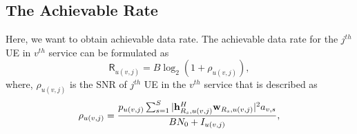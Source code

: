 \documentclass[conference]{IEEEtran}
\begin{document}
\subsection{The Achievable Rate}
Here, we want to obtain achievable data rate. The achievable data rate for the $j^{th}$ UE in $v^{th}$ service can be formulated as 
\begin{equation}\label{eq1}
\mathsf{R}_{u(v,j)} = B \log_2({1+ \rho_{u(v,j)}}),
\end{equation}
where, $\rho_{u(v,j)}$ is the SNR of $j^{th}$ UE in the $v^{th}$ service that is described as
\begin{equation}\label{eq2}
\rho_{u(v,j)} =  \frac{p_{u(v,j)}\sum_{s=1}^{S}|\bold{h}_{R_s,u(v,j)}^H \bold{w}_{R_s,u(v,j)}|^2 a_{v,s}}{BN_0 + I_{u(v,j)}},
\end{equation}





\end{document}
